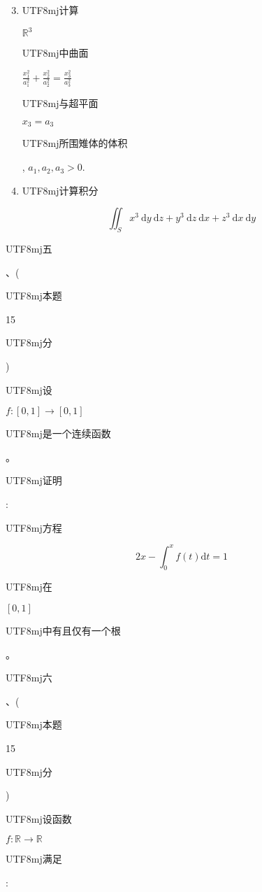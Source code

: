 \documentclass[10pt]{article}
\begin{document}
\begin{enumerate}
  \setcounter{enumi}{2}
  \item \begin{CJK}{UTF8}{mj}计算\end{CJK} $\mathbb{R}^{3}$ \begin{CJK}{UTF8}{mj}中曲面\end{CJK} $\frac{x_{1}^{2}}{a_{1}^{2}}+\frac{x_{2}^{2}}{a_{2}^{2}}=\frac{x_{3}^{2}}{a_{3}^{2}}$ \begin{CJK}{UTF8}{mj}与超平面\end{CJK} $x_{3}=a_{3}$ \begin{CJK}{UTF8}{mj}所围雉体的体积\end{CJK}, $a_{1}, a_{2}, a_{3}>0$.

  \item \begin{CJK}{UTF8}{mj}计算积分\end{CJK}

\end{enumerate}
$$
\iint_{S} x^{3} \mathrm{~d} y \mathrm{~d} z+y^{3} \mathrm{~d} z \mathrm{~d} x+z^{3} \mathrm{~d} x \mathrm{~d} y
$$
\begin{CJK}{UTF8}{mj}五\end{CJK}、(\begin{CJK}{UTF8}{mj}本题\end{CJK} 15 \begin{CJK}{UTF8}{mj}分\end{CJK}) \begin{CJK}{UTF8}{mj}设\end{CJK} $f:[0,1] \rightarrow[0,1]$ \begin{CJK}{UTF8}{mj}是一个连续函数\end{CJK}。\begin{CJK}{UTF8}{mj}证明\end{CJK}: \begin{CJK}{UTF8}{mj}方程\end{CJK}
$$
2 x-\int_{0}^{x} f(t) \mathrm{d} t=1
$$
\begin{CJK}{UTF8}{mj}在\end{CJK} $[0,1]$ \begin{CJK}{UTF8}{mj}中有且仅有一个根\end{CJK}。

\begin{CJK}{UTF8}{mj}六\end{CJK}、(\begin{CJK}{UTF8}{mj}本题\end{CJK} 15 \begin{CJK}{UTF8}{mj}分\end{CJK}) \begin{CJK}{UTF8}{mj}设函数\end{CJK} $f: \mathbb{R} \rightarrow \mathbb{R}$ \begin{CJK}{UTF8}{mj}满足\end{CJK}:
\end{document}
